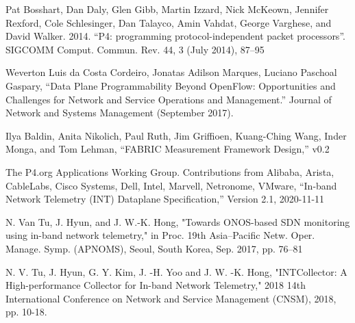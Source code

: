 \documentclass[conference]{IEEEtran}
\begin{document}
\begin{thebibliography}{00}
 Pat Bosshart, Dan Daly, Glen Gibb, Martin Izzard, Nick McKeown, Jennifer Rexford, Cole Schlesinger, Dan Talayco, Amin Vahdat, George Varghese, and David Walker. 2014. “P4: programming protocol-independent packet processors”. SIGCOMM Comput. Commun. Rev. 44, 3 (July 2014), 87–95

 Weverton Luis da Costa Cordeiro, Jonatas Adilson Marques, Luciano Paschoal Gaspary, “Data Plane Programmability Beyond OpenFlow: Opportunities and Challenges for Network and Service Operations and Management.” Journal of Network and Systems Management (September 2017).

 Ilya Baldin, Anita Nikolich, Paul Ruth, Jim Griffioen, Kuang-Ching Wang, Inder Monga, and Tom Lehman, “FABRIC Measurement Framework Design,” v0.2

 The P4.org Applications Working Group. Contributions from Alibaba, Arista, CableLabs, Cisco Systems, Dell, Intel, Marvell, Netronome, VMware, “In-band Network Telemetry (INT) Dataplane Specification,” Version 2.1, 2020-11-11

 N. Van Tu, J. Hyun, and J. W.-K. Hong, "Towards ONOS-based SDN monitoring using in-band network telemetry," in Proc. 19th Asia–Pacific Netw. Oper. Manage. Symp. (APNOMS), Seoul, South Korea, Sep. 2017, pp. 76–81

 N. V. Tu, J. Hyun, G. Y. Kim, J. -H. Yoo and J. W. -K. Hong, "INTCollector: A High-performance Collector for In-band Network Telemetry," 2018 14th International Conference on Network and Service Management (CNSM), 2018, pp. 10-18.
\end{thebibliography}
\end{document}
